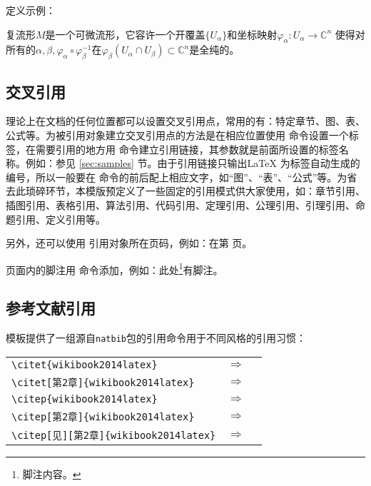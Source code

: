 定义示例：
\begin{definition}[复流形] \label{thm:samples:d}
复流形$M$是一个可微流形，它容许一个开覆盖$\{U_{\alpha}\}$和坐标映射$\varphi_{\alpha}:U_{\alpha}\rightarrow \mathbb{C}^n$ 使得对所有的$\alpha, \beta, \varphi_{\alpha}\circ \varphi_{\beta}^{-1}$在$\varphi_{\beta}(U_{\alpha}\cap U_{\beta})\subset \mathbb{C}^n$是全纯的。
\end{definition}

\subsection{交叉引用}
理论上在文档的任何位置都可以设置交叉引用点，常用的有：特定章节、图、表、公式等。为被引用对象建立交叉引用点的方法是在相应位置使用 命令设置一个标签，在需要引用的地方用  命令建立引用链接，其参数就是前面所设置的标签名称。例如：参见 \ref{sec:samples} 节。由于引用链接只输出\LaTeX{} 为标签自动生成的编号，所以一般要在  命令的前后配上相应文字，如“图”、“表”、“公式”等。为省去此琐碎环节，本模版预定义了一些固定的引用模式供大家使用，如：章节引用、插图引用、表格引用、算法引用、代码引用、定理引用、公理引用、引理引用、命题引用、定义引用等。

另外，还可以使用 引用对象所在页码，例如：在第 \pageref{fig:samples:blcfy} 页。

页面内的脚注用 命令添加，例如：此处\footnote{脚注内容。}有脚注。

\subsection{参考文献引用}\label{sec:samples:cite}
模板提供了一组源自\texttt{natbib}包的引用命令用于不同风格的引用习惯：
\begin{center}
\begin{tabular}{lcl}
\verb|\citet{wikibook2014latex}| & $\Rightarrow$ & \citet{wikibook2014latex} \\
\verb|\citet[第2章]{wikibook2014latex}| & $\Rightarrow$ & \citet[第2章]{wikibook2014latex} \\
\verb|\citep{wikibook2014latex}| & $\Rightarrow$ & \citep{wikibook2014latex} \\
\verb|\citep[第2章]{wikibook2014latex}| & $\Rightarrow$ & \citep[第2章]{wikibook2014latex} \\
\verb|\citep[见][第2章]{wikibook2014latex}| & $\Rightarrow$ & \citep[见][第2章]{wikibook2014latex}
\end{tabular}
\end{center}

